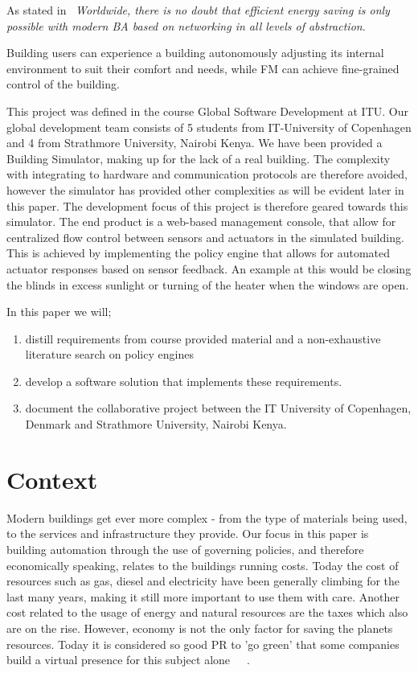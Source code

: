As stated in~\cite{ba-short} \textit{Worldwide, there is no doubt that efficient energy saving is only possible with modern BA based on networking in all levels of abstraction}.

Building users can experience a building autonomously adjusting its internal environment to suit their comfort and needs, while FM can achieve fine-grained control of the building.

This project was defined in the course Global Software Development at ITU. Our global development team consists of 5 students from IT-University of Copenhagen and 4 from Strathmore University, Nairobi Kenya. We have been provided a Building Simulator, making up for the lack of a real building. The complexity with integrating to hardware and communication protocols are therefore avoided, however the simulator has provided other complexities as will be evident later in this paper. The development focus of this project is therefore geared towards this simulator. The end product is a web-based management console, that allow for centralized flow control between sensors and actuators in the simulated building. This is achieved by implementing the policy engine that allows for automated actuator responses based on sensor feedback. An example at this would be closing the blinds in excess sunlight or turning of the heater when the windows are open.

In this paper we will; 
\begin{enumerate}
	\item distill requirements from course provided material and a non-exhaustive literature search on policy engines
	\item develop a software solution that implements these requirements.
	\item document the collaborative project between the IT University of Copenhagen, Denmark and Strathmore University, Nairobi Kenya.
\end{enumerate}

\section{Context} \label{sec:context}
Modern buildings get ever more complex - from the type of materials being used, to the services and infrastructure they provide. Our focus in this paper is building automation through the use of governing policies, and therefore economically speaking, relates to the buildings running costs. Today the cost of resources such as gas, diesel and electricity have been generally climbing for the last many years, making it still more important to use them with care. Another cost related to the usage of energy and natural resources are the taxes which also are on the rise. However, economy is not the only factor for saving the planets resources. Today it is considered so good PR to 'go green' that some companies build a virtual presence for this subject alone~\cite{green-google}~\cite{green-facebook}~\cite{green-microsoft}.

